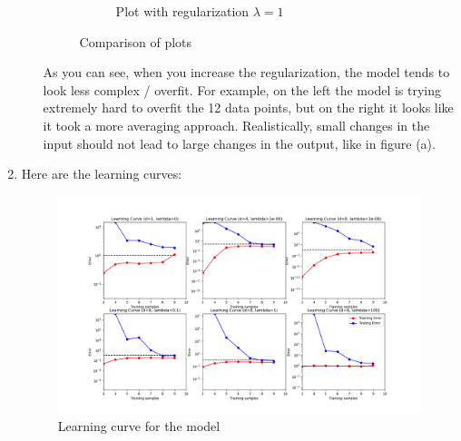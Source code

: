 \documentclass[12pt]{article}
\theoremstyle{definitionstyle}
\begin{document}
\begin{enumerate}[leftmargin=\labelsep]
\begin{enumerate}
\begin{figure}[H]
\begin{subfigure}[b]{0.45\textwidth}
                    \caption{Plot with regularization $\lambda = 1$}
                    \label{fig:reg_1_plot}
                \end{subfigure}
                \caption{Comparison of plots}
            \end{figure}
            As you can see, when you increase the regularization, the model tends to look less complex / overfit. For example, on the left the model is trying extremely hard to overfit the 12 data points, but on the right it looks like it took a more averaging approach. Realistically, small changes in the input should not lead to large changes in the output, like in figure (a).
        \end{enumerate}

        \item Here are the learning curves:
        \begin{figure}[H]
            \centering
            \includegraphics[width=\textwidth]{learning_curve.png}
            \caption{Learning curve for the model}
            \label{fig:learning_curve}
        \end{figure}


\end{enumerate}
\end{document}
